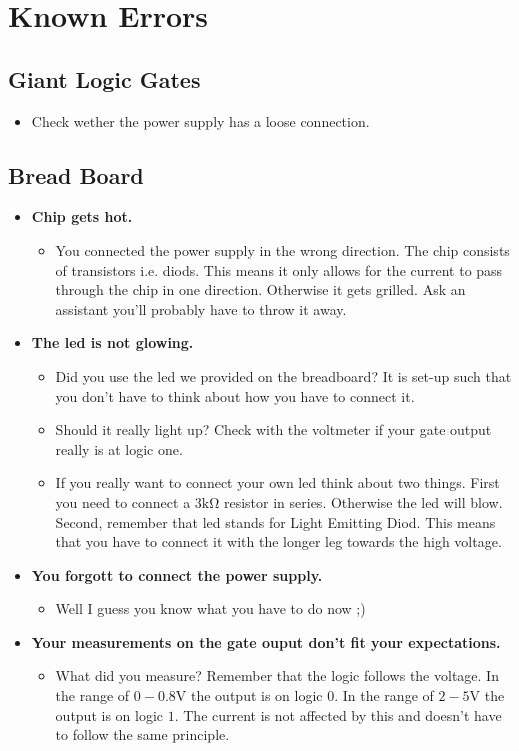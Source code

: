 \newpage
\section{Known Errors}
\subsection{Giant Logic Gates}
\begin{itemize}
	\item Check wether the power supply has a loose connection.
\end{itemize}
\subsection{Bread Board}
\begin{itemize}
	\item \textbf{Chip gets hot.} 
	\begin{itemize}
		\item You connected the power supply in the wrong direction. The chip consists of transistors i.e. diods. This means it only allows for the current to pass through the chip in one direction. Otherwise it gets grilled. Ask an assistant you'll probably have to throw it away.
	\end{itemize}
	\item \textbf{The led is not glowing.}
	\begin{itemize}
		\item Did you use the led we provided on the breadboard? It is set-up such that you don't have to think about how you have to connect it.
		\item Should it really light up? Check with the voltmeter if your gate output really is at logic one.
		\item If you really want to connect your own led think about two things. First you need to connect a $3\si{\kilo\ohm}$ resistor in series. Otherwise the led will blow. Second, remember that led stands for Light Emitting Diod. This means that you have to connect it with the longer leg towards the high voltage. 
	\end{itemize}
	\item \textbf{You forgott to connect the power supply.}
	\begin{itemize}
		\item Well I guess you know what you have to do now ;)
	\end{itemize}
	\item \textbf{Your measurements on the gate ouput don't fit your expectations.}
	\begin{itemize}
		\item What did you measure? Remember that the logic follows the voltage. In the range of $0-0.8\si{\volt}$ the output is on logic $0$. In the range of $2-5\si{\volt}$ the output is on logic $1$. The current is not affected by this and doesn't have to follow the same principle.
	\end{itemize}
\end{itemize}